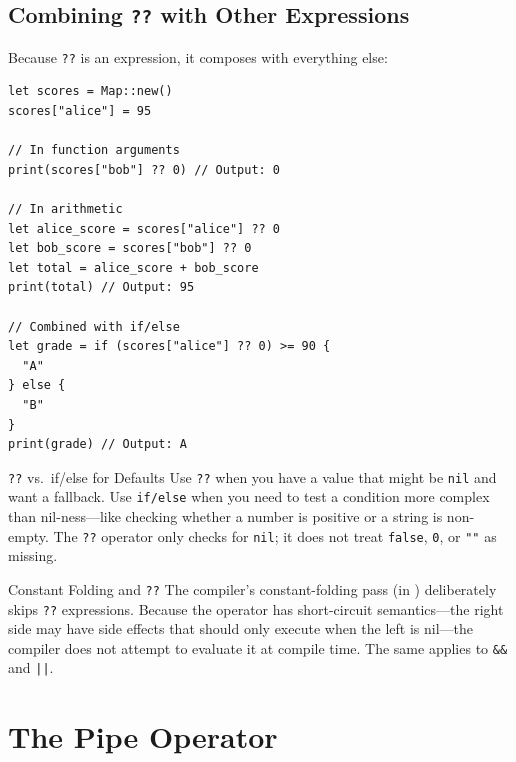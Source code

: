 \subsection{Combining \texttt{??} with Other Expressions}\label{sec:nil-coalesce-combining}

Because \lstinline|??| is an expression, it composes with everything else:

\begin{lstlisting}[language=Lattice, caption={Nil-coalescing in various contexts}]
let scores = Map::new()
scores["alice"] = 95

// In function arguments
print(scores["bob"] ?? 0) // Output: 0

// In arithmetic
let alice_score = scores["alice"] ?? 0
let bob_score = scores["bob"] ?? 0
let total = alice_score + bob_score
print(total) // Output: 95

// Combined with if/else
let grade = if (scores["alice"] ?? 0) >= 90 {
  "A"
} else {
  "B"
}
print(grade) // Output: A
\end{lstlisting}

\begin{tipbox}{\texttt{??} vs.\ if/else for Defaults}
Use \lstinline|??| when you have a value that might be \lstinline|nil| and want a fallback. Use \lstinline|if/else| when you need to test a condition more complex than nil-ness---like checking whether a number is positive or a string is non-empty. The \lstinline|??| operator only checks for \lstinline|nil|; it does not treat \lstinline|false|, \lstinline|0|, or \lstinline|""| as missing.
\end{tipbox}

\begin{notebox}{Constant Folding and \texttt{??}}
The compiler's constant-folding pass (in ) deliberately skips \lstinline|??| expressions. Because the operator has short-circuit semantics---the right side may have side effects that should only execute when the left is nil---the compiler does not attempt to evaluate it at compile time. The same applies to \lstinline|&&| and \lstinline{||}.
\end{notebox}

\section{The Pipe Operator}\label{sec:pipe-operator}

